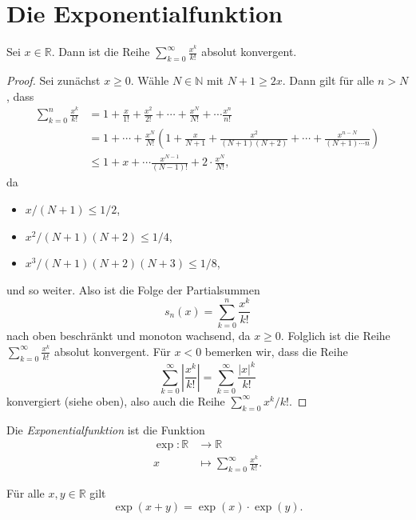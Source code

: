 \documentclass[../main.tex]{subfiles}
\begin{document}
\section{Die Exponentialfunktion}
\begin{lemma*}
  Sei $x \in \mathbb{R}$. Dann ist die Reihe
  $\sum_{k=0}^{\infty} \frac{x^k}{k!}$ absolut konvergent.
\end{lemma*}

\begin{proof}
  Sei zunächst $x \geq 0$. Wähle $N \in \mathbb{N}$ mit
  $N+ 1 \geq 2x$.
  Dann gilt für alle $n > N$, dass
  \begin{align*}
    \sum_{k=0}^{n} \frac{x^k}{k!}    & 
    = 1 + \frac{x}{1!} + \frac{x^2}{2!} + \cdots
    + \frac{x^N}{N!} + \cdots \frac{x^n}{n!} \\ &
    = 1 + \cdots + \frac{x^N}{N!}
    \left( 1 + \frac{x}{N+1} + \frac{x^2}{(N+1)(N+2)}
  + \cdots + \frac{x^{n-N}}{(N+1) \cdots n}\right)\\ &
    \leq 1 + x + \cdots \frac{x^{N-1}}{(N-1)!} + 2 \cdot
    \frac{x^N}{N!},
  \end{align*}
  da
  \begin{itemize}
    \item $x/(N+1) \leq 1/2$,
    \item $x^2/(N+1)(N+2) \leq 1/4$,
    \item $x^3/(N+1)(N+2)(N+3) \leq 1/8$,
  \end{itemize}
  und so weiter.
  Also ist die Folge der Partialsummen
  \[
    s_n(x) = \sum_{k=0}^{n} \frac{x^k}{k!}
  \]
  nach oben beschränkt und monoton wachsend, da $x \geq 0$.
  Folglich ist die Reihe
  $\sum_{k=0}^{\infty} \frac{x^k}{k!}$ absolut konvergent.
  Für $x < 0$ bemerken wir,
  dass die Reihe
  \[
    \sum_{k=0}^{\infty} \left| \frac{x^k}{k!} \right|
    = \sum_{k=0}^{\infty} \frac{|x|^k}{k!}
  \]
  konvergiert (siehe oben), also auch die Reihe
  $\sum_{k=0}^{\infty} x^k/k!$.
\end{proof}

\begin{definition}
  Die \emph{Exponentialfunktion} ist die Funktion
  \begin{align*}
    \exp \colon \mathbb{R} & \to \mathbb{R} \\
    x & \mapsto \sum_{k=0}^{\infty} \frac{x^k}{k!}.
  \end{align*}
\end{definition}

\begin{theorem}\label{thm:exp-product-sum}
  Für alle $x, y \in \mathbb{R}$ gilt
  \[
    \exp(x + y) = \exp (x) \cdot \exp (y).
  \]
\end{theorem}
\end{document}
